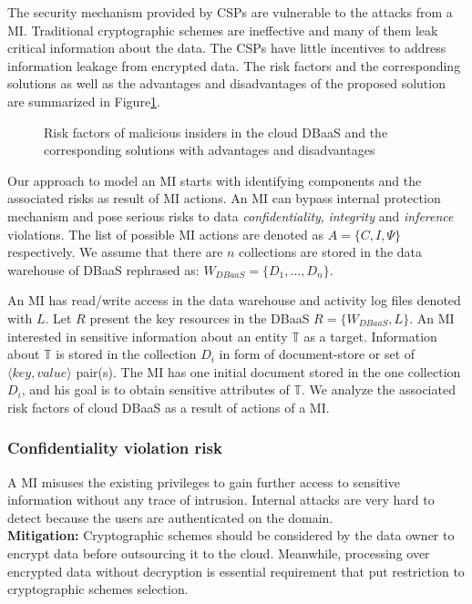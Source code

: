 The security mechanism provided by CSPs are vulnerable to the attacks from a MI.  Traditional cryptographic schemes are ineffective and many of them leak critical information about the  data. The CSPs have little incentives to address information leakage from encrypted data. The risk factors and the corresponding solutions as well as the advantages and disadvantages of the proposed solution are summarized in Figure\ref{fig:MIriskFactors}.

\begin{figure}[H]
\centering
\resizebox{0.9\textwidth}{!}{}
\caption{Risk factors of malicious insiders in the cloud DBaaS and the corresponding solutions with advantages and disadvantages}
\label{fig:MIriskFactors}
\end{figure}


Our approach to model an MI starts with identifying components and the associated risks as result of MI actions. An MI can bypass internal protection mechanism and pose serious risks to data \textit{confidentiality},  \textit{integrity} and \textit{inference} violations. The list of possible MI actions are denoted as $A=\{C, I,\Psi \}$ respectively. We assume that there are $n$ collections are stored in the data warehouse of DBaaS rephrased as: $W_{DBaaS}= \{D_1,\dots,D_n\}$.


An MI has read/write access in the data warehouse and activity log files denoted with $L$. Let $R$ present the key resources in the DBaaS $R=\{W_{DBaaS}, L\}$. An MI interested in sensitive information about an entity $\mathbb{T}$ as a target. Information about $\mathbb{T}$ is stored in the collection $D_i$ in form of document-store or set of $\langle key, value \rangle$ pair(s). The MI has one initial document stored in the one collection $D_i$, and his goal is to obtain sensitive attributes of $\mathbb{T}$. We analyze the associated risk factors of cloud DBaaS as a result of actions of a MI.\\


\subsubsection*{Confidentiality violation risk}
\label{subsec:ConfidentialityViolation}
A MI misuses the existing privileges to gain further access to sensitive information without any trace of intrusion. Internal attacks are very hard to detect because the users are authenticated on the domain.\\
\textbf{Mitigation:} Cryptographic schemes should be considered by the data owner to encrypt data before outsourcing it to the cloud. Meanwhile, processing over encrypted data without decryption is essential requirement that put restriction to cryptographic schemes selection.\\

